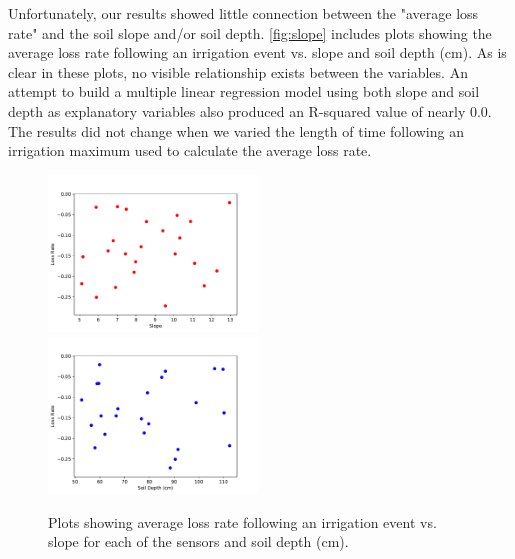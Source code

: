 \documentclass[12pt]{scrartcl}
\begin{document}
Unfortunately, our results showed little connection between the "average loss rate" and the soil slope and/or soil depth. \autoref{fig:slope} includes plots showing the average loss rate following an irrigation event vs. slope and soil depth (cm). As is clear in these plots, no visible relationship exists between the variables. An attempt to build a multiple linear regression model using both slope and soil depth as explanatory variables also produced an R-squared value of nearly 0.0. The results did not change when we varied the length of time following an irrigation maximum used to calculate the average loss rate. 


\begin{figure}[!htb]
    \centering
    \includegraphics[width=0.495\textwidth]{figures/slope_loss.pdf}
    \includegraphics[width=0.495\textwidth]{figures/soil_depth_loss.pdf}
    \caption{Plots showing average loss rate following an irrigation event vs. slope for each of the sensors and soil depth (cm).}
    \label{fig:slope}
\end{figure}
\end{document}
